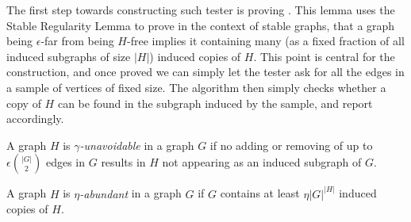     The first step towards constructing such tester is proving .
    This lemma uses the Stable Regularity Lemma to prove in the context of stable graphs, that a graph being $\epsilon$-far
    from being $H$-free implies it containing many (as a fixed fraction of all induced subgraphs of size $|H|$)
    induced copies of $H$.
    This point is central for the construction, and once proved we can simply let the tester ask for all the edges
    in a sample of vertices of fixed size.
    The algorithm then simply checks whether a copy of $H$ can be found in the subgraph induced by the sample, and report
    accordingly.

    \begin{definition} \label{def:unavoidable}
        A graph $H$ is \emph{$\gamma$-unavoidable} in a graph $G$ if no adding or removing of up to $\epsilon {|G| \choose 2}$
        edges in $G$ results in $H$ not appearing as an induced subgraph of $G$.
    \end{definition}

    \begin{definition} \label{def:abundant}
        A graph $H$ is \emph{$\eta$-abundant} in a graph $G$ if $G$ contains at least $\eta |G|^{|H|}$
        induced copies of $H$.
    \end{definition}

